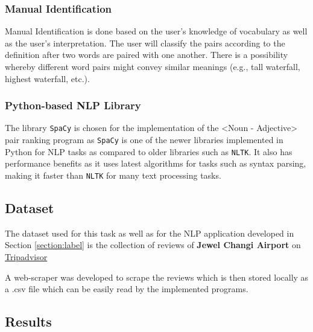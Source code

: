 \documentclass[sigconf,nonacm=true]{acmart}
\begin{document}
\subsubsection{Manual Identification}
Manual Identification is done based on the user's knowledge of vocabulary as well as the user's interpretation. The user will classify the pairs according to the definition after two words are paired with one another. There is a possibility whereby different word pairs might convey similar meanings (e.g., tall waterfall, highest waterfall, etc.).
\subsubsection{Python-based NLP Library}
The library \verb|SpaCy| is chosen for the implementation of the <Noun - Adjective> pair ranking program as \verb|SpaCy| is one of the newer libraries implemented in Python for NLP tasks as compared to older libraries such as \verb|NLTK|. It also has performance benefits as it uses latest algorithms for tasks such as syntax parsing, making it faster than \verb|NLTK| for many text processing tasks.

\subsection{Dataset}
\label{subsection:dataset}
The dataset used for this task as well as for the NLP application developed in Section \ref{section:label} is the collection of reviews of \textbf{Jewel Changi Airport} on \href{https://www.tripadvisor.com.sg/Attraction_Review-g294265-d17237163-Reviews-Jewel_Changi_Airport-Singapore.html}{Tripadvisor}

A web-scraper was developed to scrape the reviews which is then stored locally as a .csv file which can be easily read by the implemented programs.

\subsection{Results}
\end{document}
